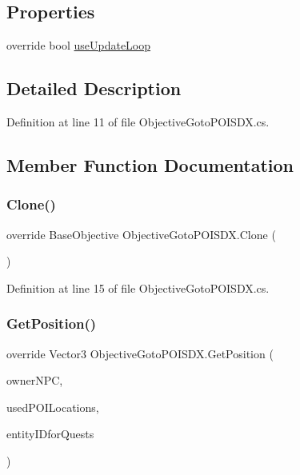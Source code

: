 \subsection*{Properties}
\begin{DoxyCompactItemize}
\item 
override bool \mbox{\hyperlink{class_objective_goto_p_o_i_s_d_x_a2637281b7a7a56cf77c104f462180ab1}{use\+Update\+Loop}}
\end{DoxyCompactItemize}


\subsection{Detailed Description}


Definition at line 11 of file Objective\+Goto\+P\+O\+I\+S\+D\+X.\+cs.



\subsection{Member Function Documentation}
\mbox{\label{class_objective_goto_p_o_i_s_d_x_aab74c80adfb026d8cc2ddd2cffeb5266}} 
\subsubsection{\texorpdfstring{Clone()}{Clone()}}
{\footnotesize\ttfamily override Base\+Objective Objective\+Goto\+P\+O\+I\+S\+D\+X.\+Clone (\begin{DoxyParamCaption}{ }\end{DoxyParamCaption})}



Definition at line 15 of file Objective\+Goto\+P\+O\+I\+S\+D\+X.\+cs.

\mbox{\label{class_objective_goto_p_o_i_s_d_x_a00a64fdf46014806e613fa91f9f2388e}} 
\subsubsection{\texorpdfstring{GetPosition()}{GetPosition()}}
{\footnotesize\ttfamily override Vector3 Objective\+Goto\+P\+O\+I\+S\+D\+X.\+Get\+Position (\begin{DoxyParamCaption}\item[{Entity\+N\+PC}]{owner\+N\+PC,  }\item[{List$<$ Vector2 $>$}]{used\+P\+O\+I\+Locations,  }\item[{int}]{entity\+I\+Dfor\+Quests }\end{DoxyParamCaption})\hspace{0.3cm}{\ttfamily [protected]}}



